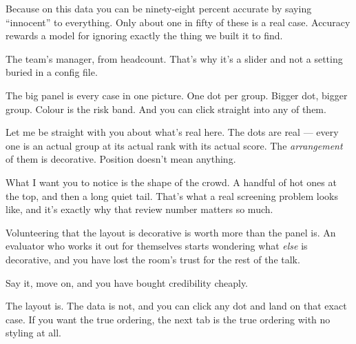 \documentclass[11pt]{article}
\begin{document}
\begin{asked}
 Because on this data you can be
ninety-eight percent accurate by saying ``innocent'' to everything. Only about
one in fifty of these is a real case. Accuracy rewards a model for ignoring
exactly the thing we built it to find.

 The team's manager, from
headcount. That's why it's a slider and not a setting buried in a config file.
\end{asked}


\begin{saythis}
The big panel is every case in one picture. One dot per group. Bigger dot,
bigger group. Colour is the risk band. And you can click straight into any of
them.

Let me be straight with you about what's real here. The dots are real --- every
one is an actual group at its actual rank with its actual score. The
\emph{arrangement} of them is decorative. Position doesn't mean anything.

What I want you to notice is the shape of the crowd. A handful of hot ones at
the top, and then a long quiet tail. That's what a real screening problem looks
like, and it's exactly why that review number matters so much.
\end{saythis}

\begin{means}
Volunteering that the layout is decorative is worth more than the panel is. An
evaluator who works it out for themselves starts wondering what \emph{else} is
decorative, and you have lost the room's trust for the rest of the talk.

Say it, move on, and you have bought credibility cheaply.
\end{means}

\begin{asked}
 The layout is. The data is not, and you can click
any dot and land on that exact case. If you want the true ordering, the next
tab is the true ordering with no styling at all.
\end{asked}

\end{document}
